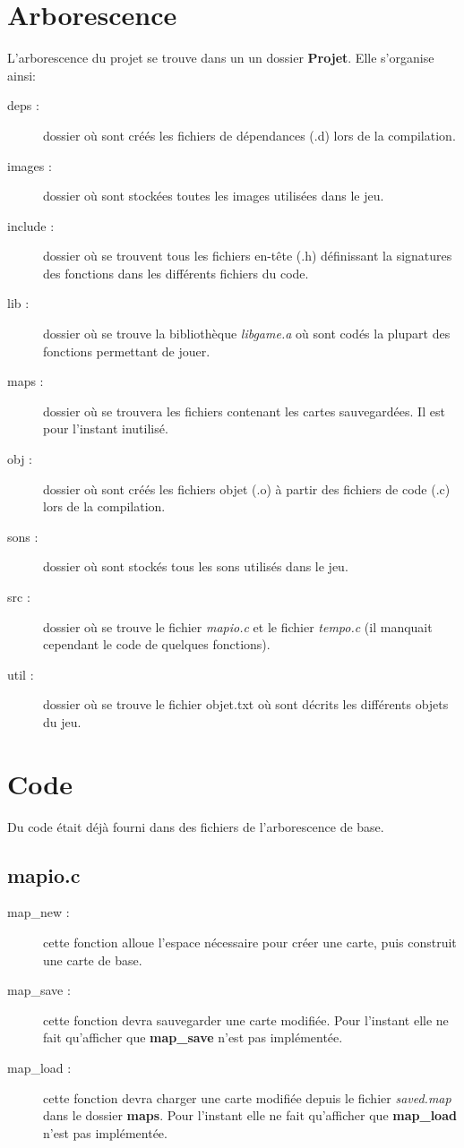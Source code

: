 \documentclass{report}
\begin{document}
\section{Arborescence}
L'arborescence du projet se trouve dans un un dossier \textbf{Projet}. Elle s'organise ainsi:
\begin{description}
\item[deps :] dossier où sont créés les fichiers de dépendances (.d) lors de la compilation.
\item[images :] dossier où sont stockées toutes les images utilisées dans le jeu.
\item[include :] dossier où se trouvent tous les fichiers en-tête (.h) définissant la signatures des fonctions dans les différents fichiers du code.
\item[lib :] dossier où se trouve la bibliothèque \textit{libgame.a} où sont codés la plupart des fonctions permettant de jouer.
\item[maps :] dossier où se trouvera les fichiers contenant les cartes sauvegardées. Il est pour l'instant inutilisé.
\item[obj :] dossier où sont créés les fichiers objet (.o) à partir des fichiers de code (.c) lors de la compilation.
\item[sons :] dossier où sont stockés tous les sons utilisés dans le jeu.
\item[src :] dossier où se trouve le fichier \textit{mapio.c} et le fichier \textit{tempo.c} (il manquait cependant le code de quelques fonctions).
\item[util :] dossier où se trouve le fichier objet.txt où sont décrits les différents objets du jeu.
\end{description}

\section{Code}
Du code était déjà fourni dans des fichiers de l'arborescence de base.

\setcounter{subsection}{0}
\subsection{mapio.c}
\begin{description}
\item[map\_new :] cette fonction alloue l'espace nécessaire pour créer une carte, puis construit une carte de base.
\item[map\_save :] cette fonction devra sauvegarder une carte modifiée. Pour l'instant elle ne fait qu'afficher que \textbf{map\_save} n'est pas implémentée.
\item[map\_load :] cette fonction devra charger une carte modifiée depuis le fichier \textit{saved.map} dans le dossier \textbf{maps}. Pour l'instant elle ne fait qu'afficher que \textbf{map\_load} n'est pas implémentée.
\end{description}
\end{document}
